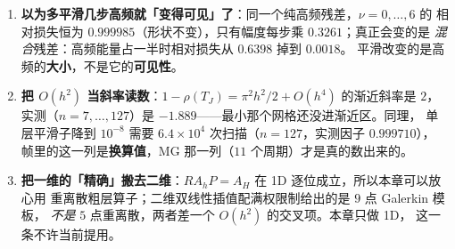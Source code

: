 \begin{enumerate}
        而粗层可见部分 $PRr$ 的高频能量比是 $0.0000$。粗网格上的一切都是低频，
        包括那些本来是高频的东西。
  \item \textbf{以为多平滑几步高频就「变得可见」了}：同一个纯高频残差，$\nu=0,\dots,6$ 的
        相对损失恒为 $0.999985$（形状不变），只有幅度每步乘 $0.3261$；真正会变的是
        \emph{混合}残差：高频能量占一半时相对损失从 $0.6398$ 掉到 $0.0018$。
        平滑改变的是高频的\textbf{大小}，不是它的\textbf{可见性}。
  \item \textbf{把 $O(h^2)$ 当斜率读数}：$1-\rho(T_J)=\pi^2h^2/2+O(h^4)$ 的渐近斜率是 $2$，
        实测（$n=7,\dots,127$）是 $-1.889$——最小那个网格还没进渐近区。同理，
        单层平滑子降到 $10^{-8}$ 需要 $6.4\times10^{4}$ 次扫描（$n=127$，实测因子 $0.999710$），
        帧里的这一列是\textbf{换算值}，MG 那一列（$11$ 个周期）才是真的数出来的。
  \item \textbf{把一维的「精确」搬去二维}：$RA_hP=A_H$ 在 1D 逐位成立，所以本章可以放心用
        重离散粗层算子；二维双线性插值配满权限制给出的是 $9$ 点 Galerkin 模板，
        \emph{不是} $5$ 点重离散，两者差一个 $O(h^2)$ 的交叉项。本章只做 1D，
        这一条不许当前提用。
\end{enumerate}


